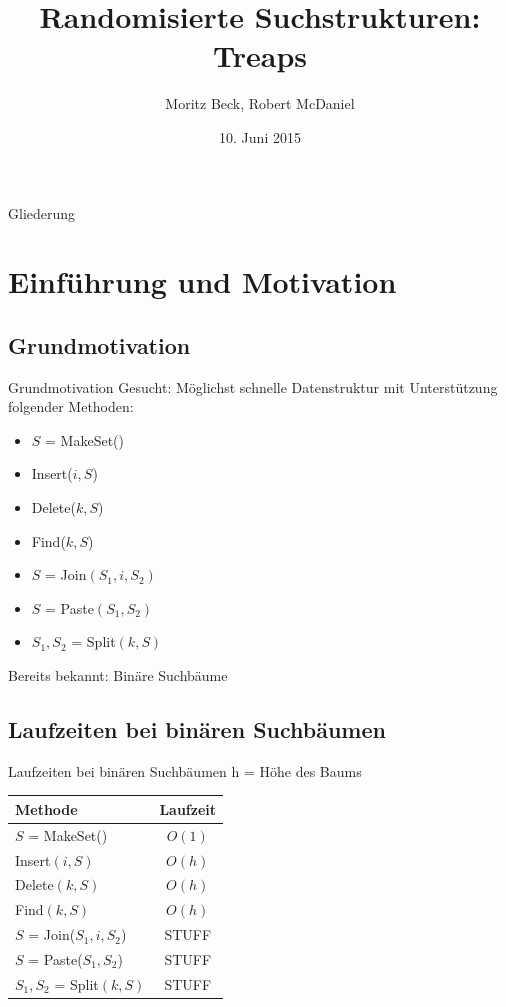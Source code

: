 \documentclass[t]{beamer}
\title[Treaps]{Randomisierte Suchstrukturen: Treaps}
\author[M. Beck, R.McDaniel]{Moritz Beck, Robert McDaniel}
\date[10.06.2015]{10. Juni 2015}
\theoremstyle{plain}
\begin{document}
{

\begin{frame}%
    \titlepage
\end{frame}

\begin{frame}{Gliederung}
    \tableofcontents
\end{frame}
}

\section{Einführung und Motivation}
\subsection{Grundmotivation}
\begin{frame}{Grundmotivation}
    Gesucht: Möglichst schnelle Datenstruktur mit Unterstützung folgender Methoden:
    \bigskip
    \begin{itemize}
        \item<2-> $S$ = MakeSet()
        \item<3-> Insert($i, S$)
        \item<4-> Delete($k, S$)
        \item<5-> Find($k, S$)
        \item<6-> $S$ = Join$(S_1, i, S_2)$
        \item<7-> $S$ = Paste$(S_1, S_2)$
        \item<8-> $S_1, S_2$ = Split$(k, S)$ 
    \end{itemize}
    \bigskip
     Bereits bekannt: Binäre Suchbäume
\end{frame}

\subsection{Laufzeiten bei binären Suchbäumen}
\begin{frame}{Laufzeiten bei binären Suchbäumen}
	h = Höhe des Baums
	\begin{table}
	    \begin{tabular}{l | c }
	    Methode & Laufzeit\\
	    \hline
	    $S$ = MakeSet() & $O(1)$\\
	    Insert$(i, S)$ & $O(h)$\\
	    Delete$(k, S)$ & $O(h)$\\
	    Find$(k, S)$ & $O(h)$\\
	    $S$ = Join($S_1, i, S_2$) & STUFF\\
	    $S$ = Paste($S_1, S_2$) & STUFF\\
	    $S_1, S_2$ = Split$(k, S)$ & STUFF
	    \end{tabular}
	\end{table}
\end{frame}
\end{document}
